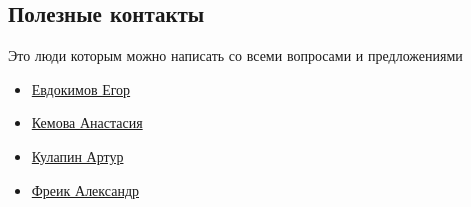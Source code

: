\subsection{Полезные контакты}
Это люди которым можно написать со всеми вопросами и предложениями
\begin{multicols}{2}
	\begin{itemize}
		\item \href{https://vk.com/ea_evdokimov}{Евдокимов Егор}
		\item \href{https://vk.com/tasyakemova}{Кемова Анастасия}
		\item \href{https://vk.com/kulart00}{Кулапин Артур}
		\item \href{https://vk.com/akira33333}{Фреик Александр}
	\end{itemize}
\end{multicols}
